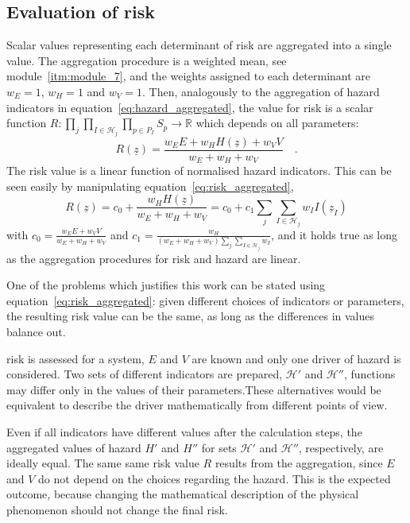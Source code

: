 \subsection{Evaluation of risk}
\label{sec:Evaluation of risk}
Scalar values representing each \gls{determinant} of \gls{risk} are aggregated into a single value. The aggregation procedure is a weighted mean, see module~\ref{itm:module_7}, and the weights assigned to each \gls{determinant} are $w_E = 1$, $w_H = 1$ and $w_V = 1$. Then, analogously to the aggregation of \gls{hazard} \glspl{indicator} in equation~\ref{eq:hazard_aggregated}, the value for \gls{risk} is a scalar function $R : \prod_j \prod_{I \in \mathcal{H}_j} \prod_{p \in P_I} S_p \to \mathbb{R}$ which depends on all parameters:
\begin{equation}
  \label{eq:risk_aggregated}
  R(\underline{z}) = \frac{w_E E + w_H H(\underline{z}) + w_V V}{w_E + w_H + w_V}
  \quad .
\end{equation}
The \gls{risk} value is a linear function of normalised \gls{hazard} \glspl{indicator}. This can be seen easily by manipulating equation~\eqref{eq:risk_aggregated},
\begin{equation}
  \label{eq:risk_linearity}
  R(\underline{z}) = c_0 + \frac{w_H H(\underline{z})}{w_E + w_H + w_V} = c_0 + c_1 \sum_j \sum_{I \in \mathcal{H}_j} w_I I(\underline{z}_I)
\end{equation}
with $c_0 = \frac{w_E E + w_V V}{w_E + w_H + w_V}$ and $c_1 = \frac{w_H}{(w_E + w_H + w_V) \sum_j \sum_{I \in \mathcal{H}_j} w_I}$, and it holds true as long as the aggregation procedures for \gls{risk} and \gls{hazard} are linear.

One of the problems which justifies this work can be stated using equation~\eqref{eq:risk_aggregated}: given different choices of \glspl{indicator} or parameters, the resulting \gls{risk} value can be the same, as long as the differences in values balance out.
\begin{example}
  \Gls{risk} is assessed for a system, $E$ and $V$ are known and only one \gls{driver} of \gls{hazard} is considered. Two sets of different \glspl{indicator} are prepared, $\mathcal{H}'$ and $\mathcal{H}''$, functions may differ only in the values of their parameters.These alternatives would be equivalent to describe the \gls{driver} mathematically from different points of view.
  
  Even if all \glspl{indicator} have different values after the calculation steps, the aggregated values of \gls{hazard} $H'$ and $H''$ for sets $\mathcal{H}'$ and $\mathcal{H}''$, respectively, are ideally equal. The same same \gls{risk} value $R$ results from the aggregation, since $E$ and $V$ do not depend on the choices regarding the \gls{hazard}.
  This is the expected outcome, because changing the mathematical description of the physical phenomenon should not change the final \gls{risk}.
\end{example}

